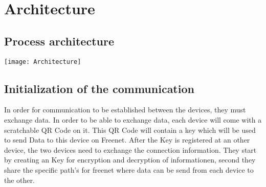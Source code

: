 \section{Architecture}
\subsection{Process architecture}
\begin{center}\texttt{[image: Architecture]}\end{center}

\subsection{Initialization of the communication}
In order for communication to be established between the devices, they must exchange data.
In order to be able to exchange data, each device will come with a scratchable QR Code on it.
This QR Code will contain a key which will be used to send Data to this device on Freenet.
\newline
After the Key is registered at an other device, the two devices need to exchange the connection information.
They start by creating an Key for encryption and decryption of informationen, second they share the specific path's for freenet where data can be send from each device to the other.
\newpage

